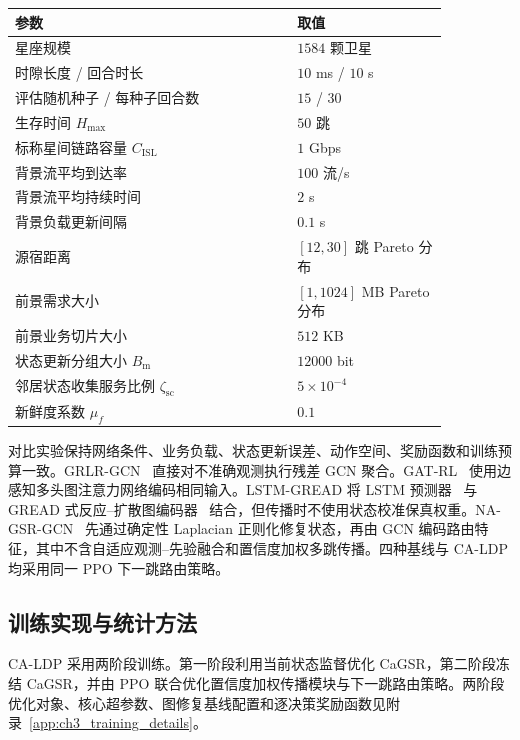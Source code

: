 \begin{table}[!htp]
\centering
{}
\label{tab:ch2_sim_params}
\footnotesize
\setlength{\tabcolsep}{5pt}
\renewcommand{\arraystretch}{1.16}
\begin{tabular}{p{0.56\linewidth} p{0.30\linewidth}}
\hline
参数 & 取值 \\
\hline
星座规模 & $1584$ 颗卫星 \\
时隙长度 / 回合时长 & $10$ ms / $10$ s \\
评估随机种子 / 每种子回合数 & $15$ / $30$ \\
生存时间 $H_{\max}$ & $50$ 跳 \\
标称星间链路容量 $C_{\mathrm{ISL}}$ & $1$ Gbps \\
背景流平均到达率 & $100$ 流/s \\
背景流平均持续时间 & $2$ s \\
背景负载更新间隔 & $0.1$ s \\
源宿距离 & $[12,30]$ 跳 Pareto 分布 \\
前景需求大小 & $[1,1024]$ MB Pareto 分布 \\
前景业务切片大小 & $512$ KB \\
状态更新分组大小 $B_{\mathrm m}$ & $12000$ bit \\
邻居状态收集服务比例 $\zeta_{\mathrm{sc}}$ & $5\times10^{-4}$ \\
新鲜度系数 $\mu_f$ & $0.1$ \\
\hline
\end{tabular}
\end{table}

对比实验保持网络条件、业务负载、状态更新误差、动作空间、奖励函数和训练预算一致。GRLR-GCN~\cite{zhang-GRLR-TVT25} 直接对不准确观测执行残差 GCN 聚合。GAT-RL~\cite{rao-DGAIEDRL-IoTJ25} 使用边感知多头图注意力网络编码相同输入。LSTM-GREAD 将 LSTM 预测器~\cite{Hochreiter-LongShortTermMemory-NC97} 与 GREAD 式反应--扩散图编码器~\cite{choi-GREAD-ICML23} 结合，但传播时不使用状态校准保真权重。NA-GSR-GCN~\cite{Yang-NodeAdaptiveRegularization-GSP25} 先通过确定性 Laplacian 正则化修复状态，再由 GCN 编码路由特征，其中不含自适应观测--先验融合和置信度加权多跳传播。四种基线与 CA-LDP 均采用同一 PPO 下一跳路由策略。

\subsection{训练实现与统计方法}
\label{subsec:ch2_training}

CA-LDP 采用两阶段训练。第一阶段利用当前状态监督优化 CaGSR，第二阶段冻结 CaGSR，并由 PPO 联合优化置信度加权传播模块与下一跳路由策略。两阶段优化对象、核心超参数、图修复基线配置和逐决策奖励函数见附录~\ref{app:ch3_training_details}。

